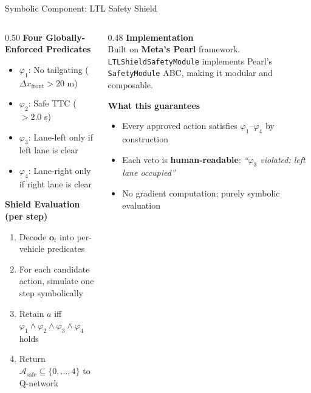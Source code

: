 \documentclass[aspectratio=169,10pt]{beamer}
\begin{document}
\begin{frame}{Symbolic Component: LTL Safety Shield}
  \begin{columns}[T]
    \begin{column}{0.50\textwidth}
      \textbf{Four Globally-Enforced Predicates}
      \begin{itemize}[<+->]\small
        \item \textcolor{symbolicorange}{\(\varphi_1\)}: No tailgating (\(\Delta x_\text{front} > 20\) m)
        \item \textcolor{symbolicorange}{\(\varphi_2\)}: Safe TTC (\(> 2.0\) s)
        \item \textcolor{symbolicorange}{\(\varphi_3\)}: Lane-left only if left lane is clear
        \item \textcolor{symbolicorange}{\(\varphi_4\)}: Lane-right only if right lane is clear
      \end{itemize}

      \pause\vspace{6pt}
      \textbf{Shield Evaluation (per step)}
      \begin{enumerate}[<+->]\small
        \item Decode \(\mathbf{o}_t\) into per-vehicle predicates
        \item For each candidate action, simulate one step symbolically
        \item Retain \(a\) iff \(\varphi_1\wedge\varphi_2\wedge\varphi_3\wedge\varphi_4\) holds
        \item Return \(\mathcal{A}_\text{safe}\subseteq\{0,\ldots,4\}\) to Q-network
      \end{enumerate}
    \end{column}
    \begin{column}{0.48\textwidth}
      \pause
      \textbf{Implementation}\\[4pt]
      Built on \textbf{Meta's Pearl} framework.
      \texttt{LTLShieldSafetyModule} implements Pearl's \texttt{SafetyModule} ABC, making it modular and composable.

      \vspace{10pt}
      \pause
      \textbf{What this guarantees}
      \begin{itemize}[<+->]\small
        \item Every approved action satisfies \(\varphi_1\)--\(\varphi_4\) by construction
        \item Each veto is \textbf{human-readable}: \textit{``\(\varphi_3\) violated: left lane occupied''}
        \item No gradient computation; purely symbolic evaluation
      \end{itemize}
    \end{column}
  \end{columns}
\end{frame}
\end{document}
